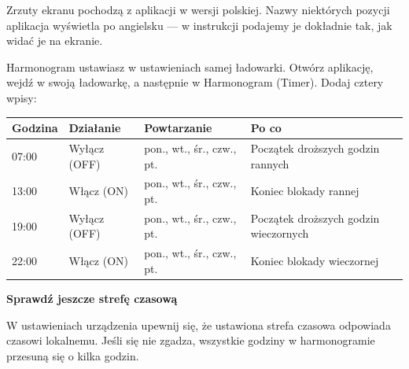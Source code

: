\documentclass[11pt]{article}
\begin{document}
\vspace{0.4cm}
{\footnotesize\color{apmuted} Zrzuty ekranu pochodzą z aplikacji w wersji polskiej. Nazwy niektórych pozycji aplikacja wyświetla po angielsku — w instrukcji podajemy je dokładnie tak, jak widać je na ekranie.}

\clearpage


Harmonogram ustawiasz w ustawieniach samej ładowarki. Otwórz aplikację, wejdź w swoją ładowarkę, a następnie w Harmonogram (Timer). Dodaj cztery wpisy:

\vspace{0.2cm}
\begin{tabularx}{\textwidth}{@{}p{2.2cm}p{3.2cm}p{3.6cm}X@{}}
\toprule
\textbf{\color{apnavy}Godzina} & \textbf{\color{apnavy}Działanie} & \textbf{\color{apnavy}Powtarzanie} & \textbf{\color{apnavy}Po co}\\
\midrule
07:00 & Wyłącz (OFF) & pon., wt., śr., czw., pt. & Początek droższych godzin rannych\\
13:00 & Włącz (ON) & pon., wt., śr., czw., pt. & Koniec blokady rannej\\
19:00 & Wyłącz (OFF) & pon., wt., śr., czw., pt. & Początek droższych godzin wieczornych\\
22:00 & Włącz (ON) & pon., wt., śr., czw., pt. & Koniec blokady wieczornej\\
\bottomrule
\end{tabularx}



\vspace{0.4cm}
{\bfseries\color{apnavy}\large Sprawdź jeszcze strefę czasową}

W ustawieniach urządzenia upewnij się, że ustawiona strefa czasowa odpowiada czasowi lokalnemu. Jeśli się nie zgadza, wszystkie godziny w harmonogramie przesuną się o kilka godzin.
\end{document}
